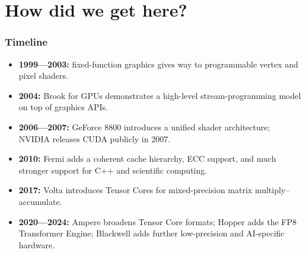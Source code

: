 \documentclass[main.tex]{subfiles}
\begin{document}
\section{How did we get here?}
\begin{frame}
  \frametitle{Timeline}
  \begin{itemize}
    \item \textbf{1999---2003:} fixed-function graphics gives way to programmable
      vertex and pixel shaders.
    \item \textbf{2004:} Brook for GPUs demonstrates a high-level stream-programming
      model on top of graphics APIs.
    \item \textbf{2006---2007:} GeForce 8800 introduces a unified shader architecture;
      NVIDIA releases CUDA publicly in 2007.
    \item \textbf{2010:} Fermi adds a coherent cache hierarchy, ECC support, and much
      stronger support for C++ and scientific computing.
    \item \textbf{2017:} Volta introduces Tensor Cores for mixed-precision matrix
      multiply--accumulate.
    \item \textbf{2020---2024:} Ampere broadens Tensor Core formats; Hopper adds the
      FP8 Transformer Engine; Blackwell adds further low-precision and AI-specific hardware.
  \end{itemize}
\end{frame}
\end{document}
